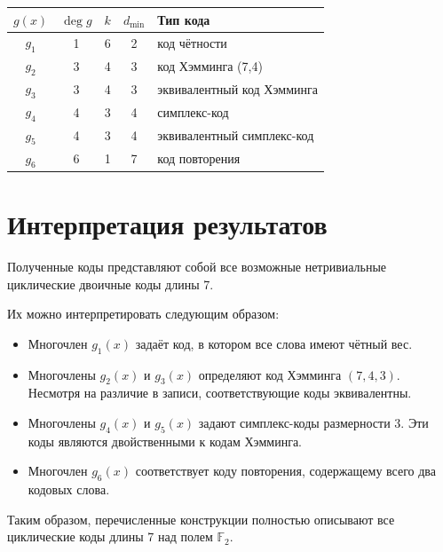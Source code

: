 \documentclass[a4paper,12pt]{article}
\begin{document}
\begin{center}
\begin{tabular}{|c|c|c|c|l|}
\hline
$g(x)$ & $\deg g$ & $k$ & $d_{\min}$ & Тип кода \\
\hline
$g_1$ & 1 & 6 & 2 & код чётности \\
$g_2$ & 3 & 4 & 3 & код Хэмминга (7,4) \\
$g_3$ & 3 & 4 & 3 & эквивалентный код Хэмминга \\
$g_4$ & 4 & 3 & 4 & симплекс-код \\
$g_5$ & 4 & 3 & 4 & эквивалентный симплекс-код \\
$g_6$ & 6 & 1 & 7 & код повторения \\
\hline
\end{tabular}
\end{center}

\section{Интерпретация результатов}

Полученные коды представляют собой все возможные нетривиальные циклические двоичные коды длины 7.

Их можно интерпретировать следующим образом:

\begin{itemize}
    \item Многочлен $g_1(x)$ задаёт код, в котором все слова имеют чётный вес.
    
    \item Многочлены $g_2(x)$ и $g_3(x)$ определяют код Хэмминга $(7,4,3)$. Несмотря на различие в записи, соответствующие коды эквивалентны.
    
    \item Многочлены $g_4(x)$ и $g_5(x)$ задают симплекс-коды размерности 3. Эти коды являются двойственными к кодам Хэмминга.
    
    \item Многочлен $g_6(x)$ соответствует коду повторения, содержащему всего два кодовых слова.
\end{itemize}

Таким образом, перечисленные конструкции полностью описывают все циклические коды длины 7 над полем $\mathbb{F}_2$.
\end{document}
